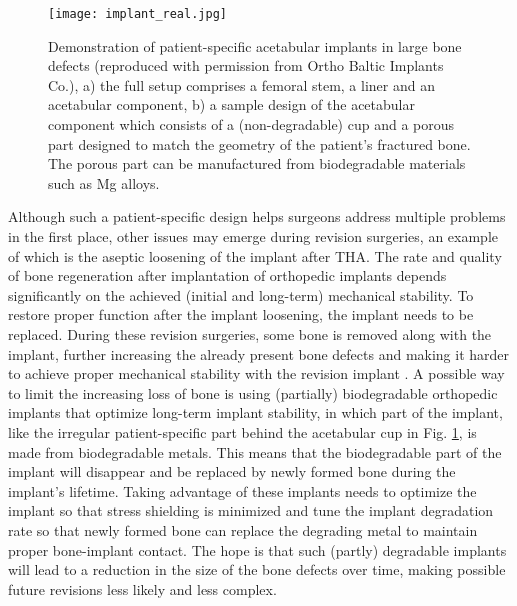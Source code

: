 \begin{figure}[htpb]
\centering
\medskip
\texttt{[image: implant\_real.jpg]}
\caption[Full setup of patient-specific acetabular implants]{Demonstration of patient-specific acetabular implants in large bone defects (reproduced with permission from Ortho Baltic Implants Co.\protect\footnotemark), a) the full setup comprises a femoral stem, a liner and an acetabular component, b) a sample design of the acetabular component which consists of a (non-degradable) cup and a porous part designed to match the geometry of the patient's fractured bone. The porous part can be manufactured from biodegradable materials such as Mg alloys.} \label{fig:cup_implant_real}
\end{figure}

Although such a patient-specific design helps surgeons address multiple problems in the first place, other issues may emerge during revision surgeries, an example of which is the aseptic loosening of the implant after {THA}. The rate and quality of bone regeneration after implantation of orthopedic implants depends significantly on the achieved (initial and long-term) mechanical stability. To restore proper function after the implant loosening, the implant needs to be replaced. During these revision surgeries, some bone is removed along with the implant, further increasing the already present bone defects and making it harder to achieve proper mechanical stability with the revision implant \cite{Luthringer2014}. A possible way to limit the increasing loss of bone is using (partially) biodegradable orthopedic implants that optimize long-term implant stability, in which part of the implant, like the irregular patient-specific part behind the acetabular cup in Fig. \ref{fig:cup_implant_real}, is made from biodegradable metals. This means that the biodegradable part of the implant will disappear and be replaced by newly formed bone during the implant's lifetime. Taking advantage of these implants needs to optimize the implant so that stress shielding is minimized and tune the implant degradation rate so that newly formed bone can replace the degrading metal to maintain proper bone-implant contact. The hope is that such (partly) degradable implants will lead to a reduction in the size of the bone defects over time, making possible future revisions less likely and less complex.


